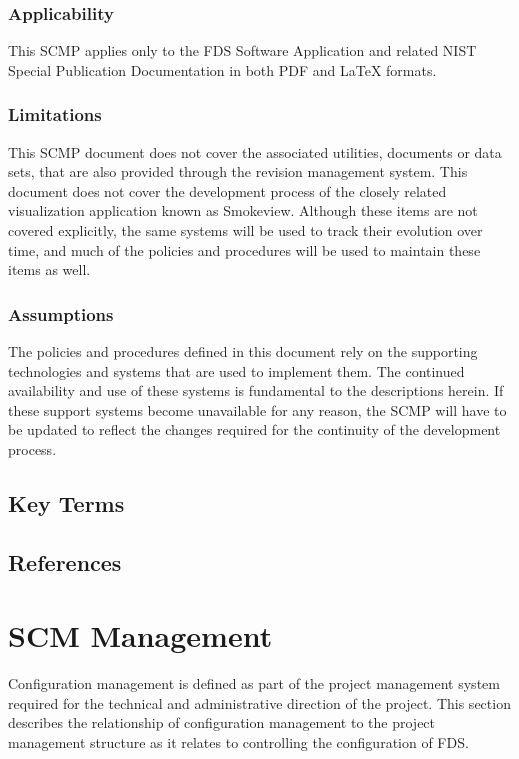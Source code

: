 \documentclass[11pt]{book}
\begin{document}
\subsection{Applicability}
This SCMP applies only to the FDS Software Application and related NIST Special Publication Documentation in both PDF and LaTeX formats.

\subsection{Limitations}
This SCMP document does not cover the associated utilities, documents or data sets, that are also provided through the revision management system. This document does not cover the development process of the closely related visualization application known as Smokeview.  Although these items are not covered explicitly, the same systems will be used to track their evolution over time, and much of the policies and procedures will be used to maintain these items as well.

\subsection{Assumptions}
The policies and procedures defined in this document rely on the supporting technologies and systems that are used to implement them.  The continued availability and use of these systems is fundamental to the descriptions herein.  If these support systems become unavailable for any reason, the SCMP will have to be updated to reflect the changes required for the continuity of the development process.

\section{Key Terms}


\section{References}


\chapter{SCM Management}

Configuration management is defined as part of the project management system required for the technical and
administrative direction of the project.  This section describes the relationship of configuration management
to the project management structure as it relates to controlling the configuration of FDS.
\end{document}
